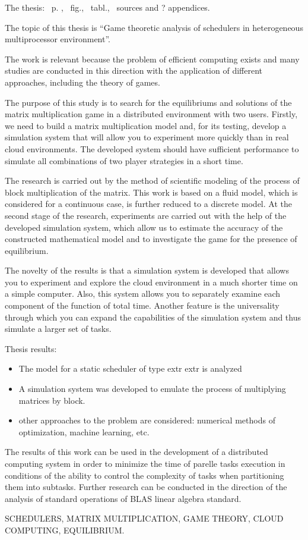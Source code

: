 
The thesis: \pageref*{MyLastPage}~p. , \totfig~fig., \tottab~tabl., ~sources and ? appendices.

The topic of this thesis is ``Game theoretic analysis of schedulers in heterogeneous multiprocessor environment''.

The work is relevant because the problem of efficient computing exists and many studies are conducted in this direction with the application of different approaches, including the theory of games.

The purpose of this study is to search for the equilibriums and solutions of the matrix multiplication game in a distributed environment with two users. Firstly, we need to build a matrix multiplication model and, for its testing, develop a simulation system that will allow you to experiment more quickly than in real cloud environments. The developed system should have sufficient performance to simulate all combinations of two player strategies in a short time.

The research is carried out by the method of scientific modeling of the process of block multiplication of the matrix. This work is based on a fluid model, which is considered for a continuous case, is further reduced to a discrete model. At the second stage of the research, experiments are carried out with the help of the developed simulation system, which allow us to estimate the accuracy of the constructed mathematical model and to investigate the game for the presence of equilibrium.

The novelty of the results is that a simulation system is developed that allows you to experiment and explore the cloud environment in a much shorter time on a simple computer. Also, this system allows you to separately examine each component of the function of total time. Another feature is the universality through which you can expand the capabilities of the simulation system and thus simulate a larger set of tasks.

Thesis results:
\begin{itemize}
	\item The model for a static scheduler of type extr extr is analyzed
	\item A simulation system was developed to emulate the process of multiplying matrices by block.
	\item other approaches to the problem are considered: numerical methods of optimization, machine learning, etc.
\end{itemize}

The results of this work can be used in the development of a distributed computing system in order to minimize the time of parelle tasks execution in conditions of the ability to control the complexity of tasks when partitioning them into subtasks. Further research can be conducted in the direction of the analysis of standard operations of BLAS linear algebra standard.

\MakeUppercase{schedulers, matrix multiplication, game theory, cloud computing, equilibrium.} 